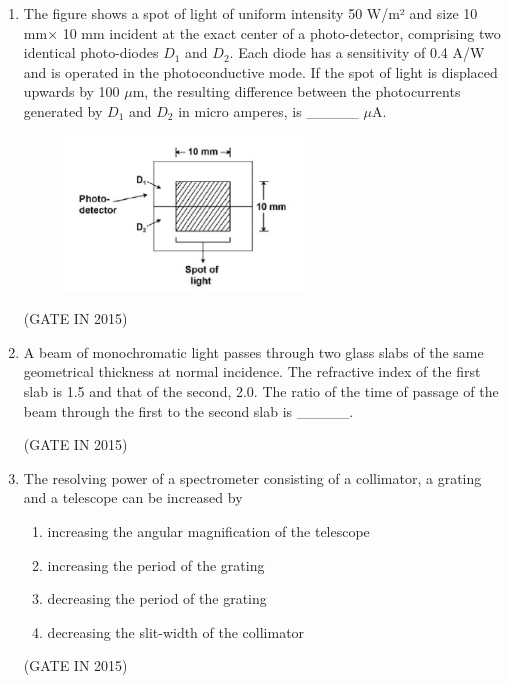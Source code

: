 \documentclass[journal]{IEEEtran}
\begin{document}
\begin{enumerate}
\item The figure shows a spot of light of uniform intensity 50 W/m² and size 10 mm$\times$ 10 mm incident at the exact center of a photo-detector, comprising two identical photo-diodes $D_1$ and $D_2$. Each diode has a sensitivity of 0.4 A/W and is operated in the photoconductive mode. If the spot of light is displaced upwards by 100 $\mu$m, the resulting difference between the photocurrents generated by $D_1$ and $D_2$ in micro amperes, is \_\_\_\_\_ $\mu$A.
\begin{figure}[H]
    \centering
      \includegraphics[width=0.6\textwidth]{32.png} 
      \caption{}
    \label{fig:fig32} 
\end{figure}
 \hfill(GATE IN 2015)

\item A beam of monochromatic light passes through two glass slabs of the same geometrical thickness at normal incidence. The refractive index of the first slab is 1.5 and that of the second, 2.0. The ratio of the time of passage of the beam through the first to the second slab is \_\_\_\_\_.

 \hfill(GATE IN 2015)

\item The resolving power of a spectrometer consisting of a collimator, a grating and a telescope can be increased by


\begin{enumerate}
\item increasing the angular magnification of the telescope
\item increasing the period of the grating
\item decreasing the period of the grating
\item decreasing the slit-width of the collimator
\end{enumerate}
\hfill(GATE IN 2015)
\end{enumerate}
\end{document}
